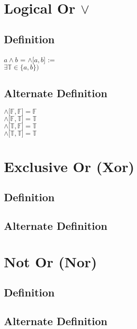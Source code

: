 \documentclass[11pt]{article}
\begin{document}
\section{Logical Or $\lor$}
\subsection{Definition}
\begin{center}
$a \land b$ = $\land \lbrack a,b \rbrack$ :=\\
$\exists \mathbb{T} \in \{a,b\})$
\end{center}
\subsection{Alternate Definition}
\begin{center}
$\land \lbrack \mathbb{F},\mathbb{F} \rbrack = \mathbb{F}$\\
$\land \lbrack \mathbb{F},\mathbb{T} \rbrack = \mathbb{T}$\\
$\land \lbrack \mathbb{T},\mathbb{F} \rbrack = \mathbb{T}$\\
$\land \lbrack \mathbb{T},\mathbb{T} \rbrack = \mathbb{T}$
\end{center}



\newpage
\section{Exclusive Or (Xor)}
\subsection{Definition}
\subsection{Alternate Definition}


\section{Not Or (Nor)}
\subsection{Definition}
\subsection{Alternate Definition}
\end{document}
